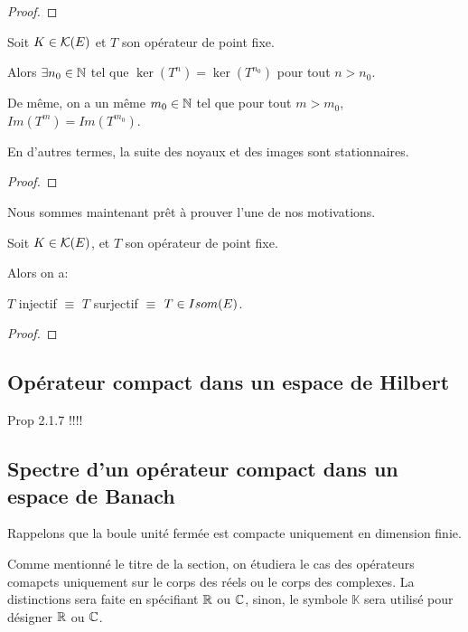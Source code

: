 \begin{proof}
\end{proof}

\begin{corollary}
	Soit $K \in \mathcal{K}(E)$ et $T$ son opérateur de point fixe.

	Alors $\exists n_{0} \in \mathbb{N}$ tel que $\ker(T^{n}) = \ker(T^{n_{0}})$
	pour tout $n > n_{0}$.

	De même, on a un même $m_{0} \in \mathbb{N}$ tel que pour tout $m > m_{0}$,
	$Im(T^{m}) = Im(T^{m_{0}})$.

	En d'autres termes, la suite des noyaux et des images sont stationnaires.
\end{corollary}

\begin{proof}
	
\end{proof}

Nous sommes maintenant prêt à prouver l'une de nos motivations.

\begin{proposition}
	\label{prop:equiv_inj_surj_bij}
	Soit $K \in \mathcal{K}(E)$, et $T$ son opérateur de point fixe.

	Alors on a:

	$T$ injectif $\equiv$ $T$ surjectif $\equiv$ $T \in Isom(E)$.
\end{proposition}

\begin{proof}
	
\end{proof}

\subsection{Opérateur compact dans un espace de Hilbert}

Prop 2.1.7 !!!!

\subsection{Spectre d'un opérateur compact dans un espace de Banach}

Rappelons que la boule unité fermée est compacte uniquement en dimension finie.

Comme mentionné le titre de la section, on étudiera le cas des opérateurs
comapcts uniquement sur le corps des réels ou le corps des complexes. La
distinctions sera faite en spécifiant $\mathbb{R}$ ou $\mathbb{C}$, sinon, le symbole
$\mathbb{K}$ sera utilisé pour désigner $\mathbb{R}$ ou $\mathbb{C}$.

